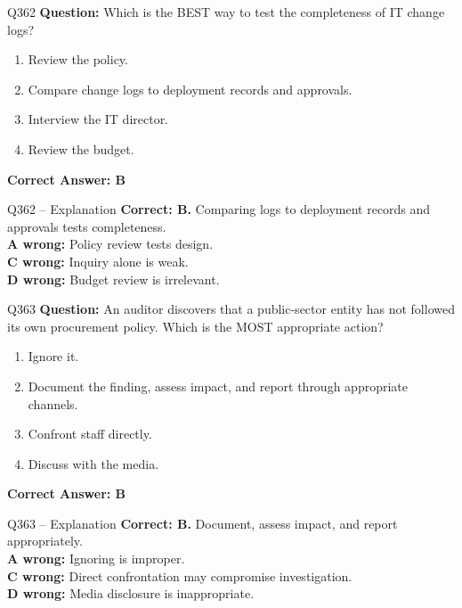 \documentclass[aspectratio=169,10pt]{beamer}
\begin{document}
	\begin{frame}[t]{Q362}
		\small
		\textbf{Question:} Which is the BEST way to test the completeness of IT change logs?
		\begin{enumerate}[label=\Alph*.,itemsep=1pt,topsep=2pt]
			\item Review the policy.
			\item Compare change logs to deployment records and approvals.
			\item Interview the IT director.
			\item Review the budget.
		\end{enumerate}
		\vspace{4pt}
		\textbf{Correct Answer: B}
	\end{frame}
	
	\begin{frame}[t]{Q362 -- Explanation}
		\small
		\textbf{Correct: B.} Comparing logs to deployment records and approvals tests completeness. \\[4pt]
		\textbf{A wrong:} Policy review tests design. \\[2pt]
		\textbf{C wrong:} Inquiry alone is weak. \\[2pt]
		\textbf{D wrong:} Budget review is irrelevant.
	\end{frame}
	
	\begin{frame}[t]{Q363}
		\small
		\textbf{Question:} An auditor discovers that a public-sector entity has not followed its own procurement policy. Which is the MOST appropriate action?
		\begin{enumerate}[label=\Alph*.,itemsep=1pt,topsep=2pt]
			\item Ignore it.
			\item Document the finding, assess impact, and report through appropriate channels.
			\item Confront staff directly.
			\item Discuss with the media.
		\end{enumerate}
		\vspace{4pt}
		\textbf{Correct Answer: B}
	\end{frame}
	
	\begin{frame}[t]{Q363 -- Explanation}
		\small
		\textbf{Correct: B.} Document, assess impact, and report appropriately. \\[4pt]
		\textbf{A wrong:} Ignoring is improper. \\[2pt]
		\textbf{C wrong:} Direct confrontation may compromise investigation. \\[2pt]
		\textbf{D wrong:} Media disclosure is inappropriate.
	\end{frame}
	
\end{document}
